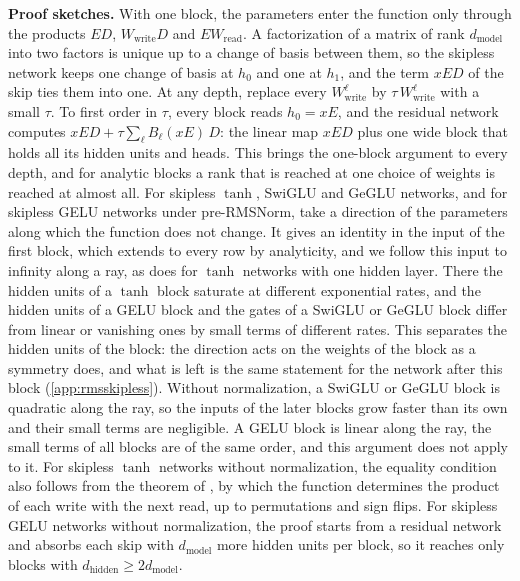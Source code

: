 \documentclass[10pt]{article}
\theoremstyle{definition}
\theoremstyle{remark}
\newcommand{\Wread}{W_{\mathrm{read}}}
\newcommand{\Wwrite}{W_{\mathrm{write}}}
\newcommand{\dm}{d_{\mathrm{model}}}
\newcommand{\dhid}{d_{\mathrm{hidden}}}
\newcommand{\para}[1]{\smallskip\noindent\textbf{#1}\hspace{0.5em}}
\begin{document}
\para{Proof sketches.} With one block, the parameters enter the function only through the products $ED$, $\Wwrite D$ and $E\Wread$. A factorization of a matrix of rank $\dm$ into two factors is unique up to a change of basis between them, so the skipless network keeps one change of basis at $h_0$ and one at $h_1$, and the term $xED$ of the skip ties them into one. At any depth, replace every $\Wwrite^{\ell}$ by $\tau\,\Wwrite^{\ell}$ with a small $\tau$. To first order in $\tau$, every block reads $h_0 = xE$, and the residual network computes $xED + \tau\sum_{\ell} B_\ell(xE)\,D$: the linear map $xED$ plus one wide block that holds all its hidden units and heads. This brings the one-block argument to every depth, and for analytic blocks a rank that is reached at one choice of weights is reached at almost all. For skipless $\tanh$, SwiGLU and GeGLU networks, and for skipless GELU networks under pre-RMSNorm, take a direction of the parameters along which the function does not change. It gives an identity in the input of the first block, which extends to every row by analyticity, and we follow this input to infinity along a ray, as \citet{sussmann1992} does for $\tanh$ networks with one hidden layer. There the hidden units of a $\tanh$ block saturate at different exponential rates, and the hidden units of a GELU block and the gates of a SwiGLU or GeGLU block differ from linear or vanishing ones by small terms of different rates. This separates the hidden units of the block: the direction acts on the weights of the block as a symmetry does, and what is left is the same statement for the network after this block (\cref{app:rmsskipless}). Without normalization, a SwiGLU or GeGLU block is quadratic along the ray, so the inputs of the later blocks grow faster than its own and their small terms are negligible. A GELU block is linear along the ray, the small terms of all blocks are of the same order, and this argument does not apply to it. For skipless $\tanh$ networks without normalization, the equality condition also follows from the theorem of \citet{fefferman1994}, by which the function determines the product of each write with the next read, up to permutations and sign flips. For skipless GELU networks without normalization, the proof starts from a residual network and absorbs each skip with $\dm$ more hidden units per block, so it reaches only blocks with $\dhid \ge 2\dm$.
\end{document}
